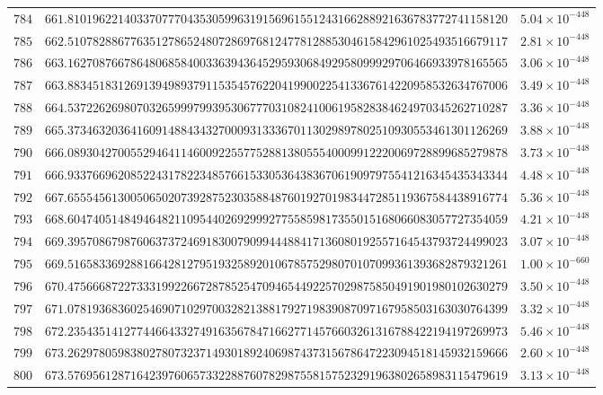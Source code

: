 \documentclass[12pt,reqno]{amsart}
\theoremstyle{remark}
\begin{document}
\begin{longtable}{clc}
$784$ & $661.8101962214033707770435305996319156961551243166288921636783772741158120$ & $5.04\times 10^{-448}$ \\
$785$ & $662.5107828867763512786524807286976812477812885304615842961025493516679117$ & $2.81\times 10^{-448}$ \\
$786$ & $663.1627087667864806858400336394364529593068492958099929706466933978165565$ & $3.06\times 10^{-448}$ \\
$787$ & $663.8834518312691394989379115354576220419900225413367614220958532634767006$ & $3.49\times 10^{-448}$ \\
$788$ & $664.5372262698070326599979939530677703108241006195828384624970345262710287$ & $3.36\times 10^{-448}$ \\
$789$ & $665.3734632036416091488434327000931333670113029897802510930553461301126269$ & $3.88\times 10^{-448}$ \\
$790$ & $666.0893042700552946411460092255775288138055540009912220069728899685279878$ & $3.73\times 10^{-448}$ \\
$791$ & $666.9337669620852243178223485766153305364383670619097975541216345435343344$ & $4.48\times 10^{-448}$ \\
$792$ & $667.6555456130050650207392875230358848760192701983447285119367584438916774$ & $5.36\times 10^{-448}$ \\
$793$ & $668.6047405148494648211095440269299927755859817355015168066083057727354059$ & $4.21\times 10^{-448}$ \\
$794$ & $669.3957086798760637372469183007909944488417136080192557164543793724499023$ & $3.07\times 10^{-448}$ \\
$795$ & $669.5165833692881664281279519325892010678575298070107099361393682879321261$ & $1.00\times 10^{-660}$ \\
$796$ & $670.4756668722733319922667287852547094654492257029875850491901980102630279$ & $3.50\times 10^{-448}$ \\
$797$ & $671.0781936836025469071029700328213881792719839087097167958503163030764399$ & $3.32\times 10^{-448}$ \\
$798$ & $672.2354351412774466433274916356784716627714576603261316788422194197269973$ & $5.46\times 10^{-448}$ \\
$799$ & $673.2629780598380278073237149301892406987437315678647223094518145932159666$ & $2.60\times 10^{-448}$ \\
$800$ & $673.5769561287164239760657332288760782987558157523291963802658983115479619$ & $3.13\times 10^{-448}$ \\

\end{longtable}
\end{document}
